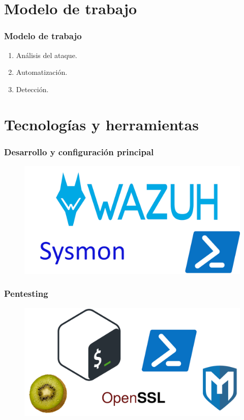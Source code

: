 \documentclass[a4paper,10pt]{beamer}
\begin{document}
\section{Modelo de trabajo}
\begin{frame}[fragile]
	\frametitle{Modelo de trabajo}

	\begin{enumerate}
		\item Análisis del ataque. %
		\item Automatización. %
		\item Detección. %
	\end{enumerate}
\end{frame}

\section{Tecnologías y herramientas}
\begin{frame}[fragile]
	\frametitle{Desarrollo y configuración principal}

	\begin{figure}[H]
		\centering
		\includegraphics[width=\textwidth]{figuras/TH_principal.png}
	\end{figure}
\end{frame}

\begin{frame}[fragile]
	\frametitle{Pentesting}

	\begin{figure}[H]
		\centering
		\includegraphics[width=\textwidth]{figuras/TH_pentesting.png}
	\end{figure}
\end{frame}
\end{document}
